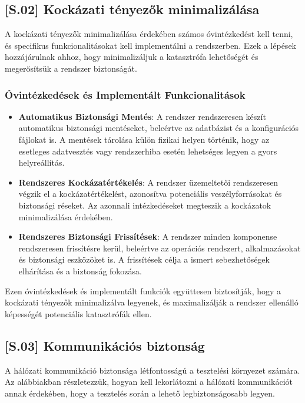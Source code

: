 \documentclass{scrreprt}
\begin{document}
\subsection{[S.02] Kockázati tényezők minimalizálása} \label{S.02}

A kockázati tényezők minimalizálása érdekében számos óvintézkedést kell tenni, és specifikus funkcionalitásokat kell implementálni a rendszerben. Ezek a
lépések hozzájárulnak ahhoz, hogy minimalizáljuk a katasztrófa lehetőségét és megerősítsük a rendszer biztonságát.

\subsubsection{Óvintézkedések és Implementált Funkcionalitások}

\begin{itemize}
      \item \textbf{Automatikus Biztonsági Mentés}:
            A rendszer rendszeresen készít automatikus biztonsági mentéseket, beleértve az adatbázist és a konfigurációs fájlokat is.
            A mentések tárolása külön fizikai helyen történik, hogy az esetleges adatvesztés vagy rendszerhiba esetén lehetséges legyen a gyors helyreállítás.
      \item \textbf{Rendszeres Kockázatértékelés}:
            A rendszer üzemeltetői rendszeresen végzik el a kockázatértékelést, azonosítva potenciális veszélyforrásokat és biztonsági réseket. Az azonnali intézkedéseket megteszik a kockázatok minimalizálása érdekében.
      \item \textbf{Rendszeres Biztonsági Frissítések}:
            A rendszer minden komponense rendszeresen frissítésre kerül, beleértve az operációs rendszert, alkalmazásokat és biztonsági eszközöket is. A frissítések célja a ismert sebezhetőségek elhárítása és a biztonság fokozása.
\end{itemize}

Ezen óvintézkedések és implementált funkciók együttesen biztosítják, hogy a kockázati tényezők minimalizálva legyenek, és maximalizálják a rendszer ellenálló
képességét potenciális katasztrófák ellen.

\subsection{[S.03] Kommunikációs biztonság} \label{S.03}

A hálózati kommunikáció biztonsága létfontosságú a tesztelési környezet számára. Az alábbiakban részletezzük, hogyan kell lekorlátozni a hálózati kommunikációt
annak érdekében, hogy a tesztelés során a lehető legbiztonságosabb legyen.
\end{document}
